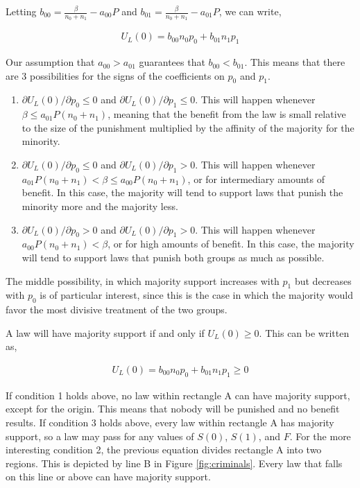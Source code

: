 Letting $b_{00} = \frac{\beta }{n_0 + n_1} -  a_{00}P $ and $b_{01} = \frac{\beta}{n_0 + n_1} -   a_{01}P $, we can write,

\begin{align}
U_L(0) = b_{00}n_0p_0 + b_{01} n_1p_1 
\end{align}

Our assumption that $a_{00} > a_{01}$ guarantees that $b_{00} < b_{01}$.  This means that there are 3 possibilities for the signs of the coefficients on $p_0$ and $p_1$.

\begin{enumerate}
\item $\partial U_L(0) / \partial p_0 \leq 0$ and $\partial U_L(0) / \partial p_1 \leq 0$.  This will happen whenever $\beta \leq   a_{01}P(n_0 + n_1)  $, meaning that the benefit from the law is small relative to the size of the punishment multiplied by the affinity of the majority for the minority.
\item $\partial U_L(0) / \partial p_0 \leq 0$ and $\partial U_L(0) / \partial p_1 > 0$.  This will happen whenever $  a_{01}P(n_0 + n_1) < \beta  \leq a_{00}P(n_0 + n_1) $, or for intermediary amounts of benefit.  In this case, the majority will tend to support laws that punish the minority more and the majority less.
\item $\partial U_L(0) / \partial p_0 > 0$ and $\partial U_L(0) / \partial p_1 > 0$.  This will happen whenever $   a_{00}P(n_0 + n_1) < \beta$, or for high amounts of benefit.  In this case, the majority will tend to support laws that punish both groups as much as possible.
\end{enumerate}

The middle possibility, in which majority support increases with $p_1$ but decreases with $p_0$ is of particular interest, since this is the case in which the majority would favor the most divisive treatment of the two groups.

A law will have majority support if and only if $U_L(0) \geq 0$.  This can be written as,

\begin{align}
U_L(0) = b_{00}n_0p_0 + b_{01} n_1p_1 \geq 0
\end{align}

If condition 1 holds above, no law within rectangle A can have majority support, except for the origin.  This means that nobody will be punished and no benefit results.  If condition 3 holds above, every law within rectangle A has majority support, so a law may pass for any values of $S(0)$, $S(1)$, and $F$.  For the more interesting condition 2, the previous equation divides rectangle A into two regions.  This is depicted by line B in Figure \ref{fig:criminals}.  Every law that falls on this line or above can have majority support.

